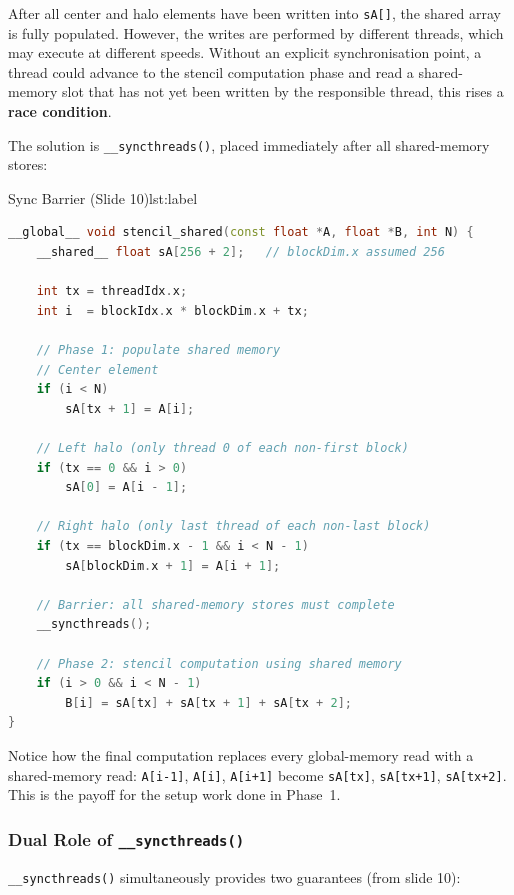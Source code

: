 After all center and halo elements have been written into \texttt{sA[]}, the
shared array is fully populated. However, the writes are performed by
different threads, which may execute at different speeds. Without an explicit
synchronisation point, a thread could advance to the stencil computation phase
and read a shared-memory slot that has not yet been written by the responsible
thread, this rises a \textbf{race condition}.
 
The solution is \texttt{\_\_syncthreads()}, placed immediately after all
shared-memory stores:


\begin{ppprogram}{Sync Barrier (Slide 10)}{lst:label}
\begin{lstlisting}[language=C++]
__global__ void stencil_shared(const float *A, float *B, int N) {
    __shared__ float sA[256 + 2];   // blockDim.x assumed 256
 
    int tx = threadIdx.x;
    int i  = blockIdx.x * blockDim.x + tx;
 
    // Phase 1: populate shared memory 
    // Center element
    if (i < N)
        sA[tx + 1] = A[i];
 
    // Left halo (only thread 0 of each non-first block)
    if (tx == 0 && i > 0)
        sA[0] = A[i - 1];
 
    // Right halo (only last thread of each non-last block)
    if (tx == blockDim.x - 1 && i < N - 1)
        sA[blockDim.x + 1] = A[i + 1];
 
    // Barrier: all shared-memory stores must complete 
    __syncthreads();
 
    // Phase 2: stencil computation using shared memory
    if (i > 0 && i < N - 1)
        B[i] = sA[tx] + sA[tx + 1] + sA[tx + 2];
}
\end{lstlisting}
\end{ppprogram}
 
Notice how the final computation replaces every global-memory read with a
shared-memory read: \texttt{A[i-1]}, \texttt{A[i]}, \texttt{A[i+1]} become
\texttt{sA[tx]}, \texttt{sA[tx+1]}, \texttt{sA[tx+2]}. This is the payoff
for the setup work done in Phase~1.
 
\subsubsection{Dual Role of \texttt{\_\_syncthreads()}}
 
\texttt{\_\_syncthreads()} simultaneously provides two guarantees (from slide
10):
 
